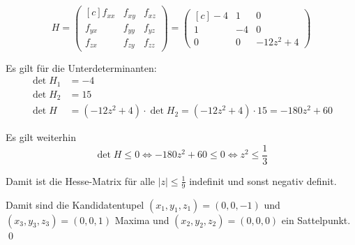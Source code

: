\documentclass[answers]{exam}
\newcommand{\abs}[1]{\left| #1 \right|}
\newcommand{\vektor}[1]{\begin{pmatrix*}[c] #1 \end{pmatrix*}}
\begin{document}
\begin{questions}
\begin{parts}
\begin{solution}
            $$
                H = \vektor{f_{xx} & f_{xy} & f_{xz} \\ f_{yx} & f_{yy} & f_{yz} \\ f_{zx} & f_{zy} & f_{zz}} = \vektor{-4 & 1 & 0 \\ 1 & -4 & 0 \\ 0 & 0 & -12z^2 + 4}
            $$

            Es gilt für die Unterdeterminanten:
            $$
                \begin{aligned}
                    \det H_1 & = -4                                                                 \\
                    \det H_2 & = 15                                                                 \\
                    \det H   & = (-12z^2 + 4) \cdot \det H_2 = (-12z^2 + 4) \cdot 15 = -180z^2 + 60
                \end{aligned}
            $$

            Es gilt weiterhin
            $$
                \det H \leq 0 \iff -180z^2 + 60 \leq 0 \iff z^2 \leq \frac{1}{3}
            $$

            Damit ist die Hesse-Matrix für alle $\abs{z} \leq \frac{1}{9}$ indefinit und sonst negativ definit.

            Damit sind die Kandidatentupel $(x_1, y_1, z_1) = (0, 0, -1)$ und $(x_3, y_3, z_3) = (0, 0, 1)$ Maxima und $(x_2, y_2, z_2) = (0, 0, 0)$ ein Sattelpunkt. \qed
        \end{solution}
    \end{parts}
\end{questions}
\end{document}
